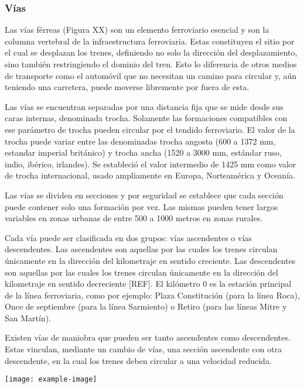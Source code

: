 \subsubsection{Vías}

Las vías férreas (Figura XX) son un elemento ferroviario esencial y son la columna vertebral de la infraestructura ferroviaria. Estas constituyen el sitio por el cual se desplazan los trenes, definiendo no solo la dirección del desplazamiento, sino también restringiendo el dominio del tren. Esto lo diferencia de otros medios de transporte como el automóvil que no necesitan un camino para circular y, aún teniendo una carretera, puede moverse libremente por fuera de esta.

Las vías se encuentran separadas por una distancia fija que se mide desde sus caras internas, denominada trocha. Solamente las formaciones compatibles con ese parámetro de trocha pueden circular por el tendido ferroviario. El valor de la trocha puede variar entre las denominadas trocha angosta (600 a 1372 mm, estandar imperial británico) y trocha ancha (1520 a 3000 mm, estándar ruso, indio, ibérico, irlandes). Se estableció el valor intermedio de 1425 mm como valor de trocha internacional, usado ampliamente en Europa, Norteamérica y Oceanía.


Las vías se dividen en secciones y por seguridad se establece que cada sección puede contener solo una formación por vez. Las mismas pueden tener largos variables en zonas urbanas de entre 500 a 1000 metros en zonas rurales. 

Cada vía puede ser clasificada en dos grupos: vías ascendentes o vías descendentes. Las ascendentes son aquellas por las cuales los trenes circulan únicamente en la dirección del kilometraje en sentido creciente. Las descendentes son aquellas por las cuales los trenes circulan únicamente en la dirección del kilometraje en sentido decreciente [REF]. El kilómetro 0 es la estación principal de la línea ferroviaria, como por ejemplo: Plaza Constitución (para la línea Roca), Once de septiembre (para la línea Sarmiento) o Retiro (para las líneas Mitre y San Martín). 

Existen vías de maniobra que pueden ser tanto ascendentes como descendentes. Estas vinculan, mediante un cambio de vías, una sección ascendente con otra descendente, en la cual los trenes deben circular a una velocidad reducida.

\lipsum[1]
\texttt{[image: example-image]}
\lipsum[1]